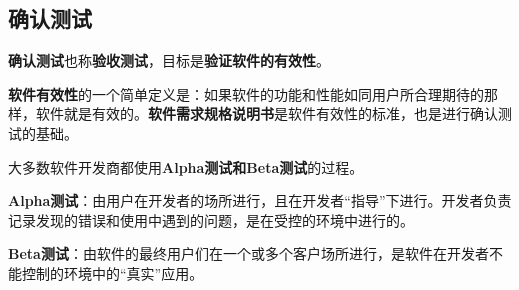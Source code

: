 \documentclass[cn, blue, normal, 12pt]{elegantnote}
\begin{document}
\subsection{确认测试}

\textbf{确认测试}也称\textbf{验收测试}，目标是\textbf{验证软件的有效性}。

\textbf{软件有效性}的一个简单定义是：如果软件的功能和性能如同用户所合理期待的那样，软件就是有效的。\textbf{软件需求规格说明书}是软件有效性的标准，也是进行确认测试的基础。

大多数软件开发商都使用\textbf{Alpha测试和Beta测试}的过程。

\textbf{Alpha测试}：由用户在开发者的场所进行，且在开发者“指导”下进行。开发者负责记录发现的错误和使用中遇到的问题，是在受控的环境中进行的。

\textbf{Beta测试}：由软件的最终用户们在一个或多个客户场所进行，是软件在开发者不能控制的环境中的“真实”应用。
\end{document}
